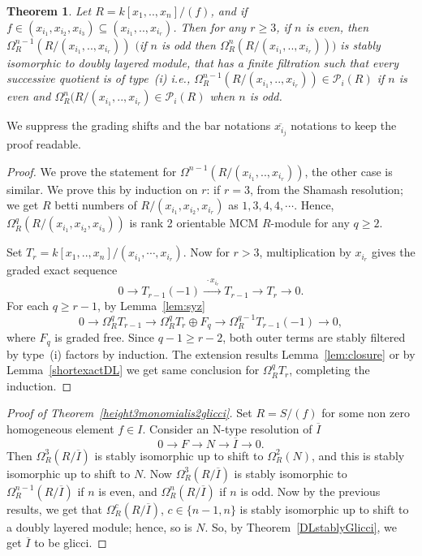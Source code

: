 \documentclass[11pt,letterpaper]{amsart}
\newcommand{\seq}{\subseteq}
\newcommand{\x}{\xrightarrow{}}
\theoremstyle{plain}
\newtheorem{thm}{Theorem}[section]
\theoremstyle{definition}
\theoremstyle{remark}
\begin{document}
\begin{thm} Let $R=k[x_1,..,x_n]/(f)$, and if $f\in(x_{i_1},x_{i_2},x_{i_3})\seq(x_{i_1},..,x_{i_r})$. Then for any $r\ge 3$, if $n$ is even, then  $\Omega^{n-1}_R(R/(x_{i_1},..,x_{i_r}))$ $($if $n$ is odd then $\Omega^n_R(R/(x_{i_1},..,x_{i_r})))$ is stably isomorphic to doubly layered module, that has a finite filtration such that every successive quotient is of type~(i) i.e., $\Omega_R^{n-1}(R/(x_{i_1},..,x_{i_r}))\in \mathcal{P}_{i}(R)$ if $n$ is even and $\Omega_R^{n}(R/(x_{i_1},..,x_{i_r})\in\mathcal{P}_i(R)$ when $n$ is odd. 
\end{thm}

We suppress the grading shifts and the bar notations $\overline{x_{i_j}}$ notations to keep the proof readable. 
   
\begin{proof} We prove the statement for $\Omega^{n-1}(R/(x_{i_1},..,x_{i_r}))$, the other case is similar. We prove this by induction on $r$: if $r=3$, from the Shamash resolution; we get $R$ betti numbers of $R/(x_{i_1},x_{i_2},x_{i_r})$ as $1,3,4,4,\cdots$. Hence, $\Omega_R^q(R/(x_{i_1},x_{i_2},x_{i_3}))$ is rank 2 orientable MCM $R$-module for any $q\ge 2$.

Set $T_r=k[x_1,..,x_n]/(x_{i_1},\cdots,x_{i_r})$. Now for $r>3$, multiplication by $x_{i_r}$ gives the graded exact sequence
\[
0\longrightarrow T_{r-1}(-1)\xrightarrow{\ \cdot x_{i_r}\ }T_{r-1}
\longrightarrow T_r\longrightarrow0.
\]
For each $q\ge r-1$, by Lemma~\ref{lem:syz}
\[
0\longrightarrow\Omega_R^qT_{r-1}
\longrightarrow\Omega_R^qT_r\oplus F_q
\longrightarrow\Omega_R^{q-1}T_{r-1}(-1)\longrightarrow0,
\]
where $F_q$ is graded free. Since $q-1\ge r-2$, both outer terms
are stably filtered by type~(i) factors by induction.
The extension results Lemma~\ref{lem:closure} or by Lemma~\ref{shortexactDL} we get same conclusion for $\Omega_R^qT_r$, completing the induction.
\end{proof}

\begin{proof}[Proof of Theorem~\ref{height3monomialis2glicci}] Set $R=S/(f)$ for some non zero homogeneous element $f\in I$. Consider an N-type resolution of $\overline{I}$ $$0\x F\x N\x \overline{I}\x 0.$$ Then $\Omega_R^3(R/\overline{I})$ is stably isomorphic up to shift to $\Omega^2_R(N)$, and this is stably isomorphic up to shift to $N$. Now $\Omega^3_R(R/\overline{I})$ is stably isomorphic to $\Omega_R^{n-1}(R/\overline{I})$ if $n$ is even, and $\Omega^n_R(R/\overline{I})$ if $n$ is odd. Now by the previous results, we get that $\Omega_R^{c}(R/\overline{I})$, $c\in\{n-1,n\}$ is stably isomorphic up to shift to a doubly layered module; hence, so is $N$. So, by Theorem~\ref{DLstablyGlicci}, we get $\overline{I}$ to be glicci.    
\end{proof}
\end{document}
